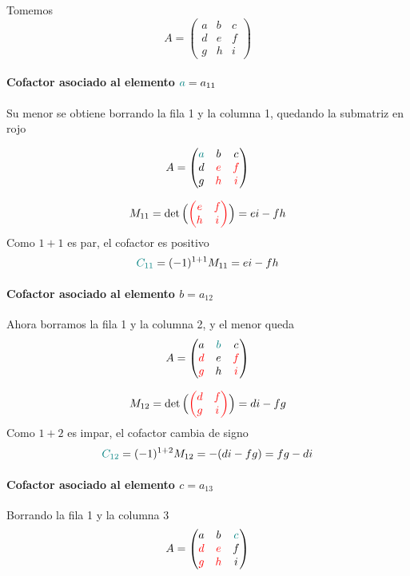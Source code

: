 \documentclass{article}
\begin{document}
Tomemos
\[
A=\begin{pmatrix}
a & b & c\\
d & e & f\\
g & h & i
\end{pmatrix}
\]

\paragraph*{Cofactor asociado al elemento \({\color{teal}a}=a_{11}\)} 
Su menor se obtiene borrando la fila 1 y la columna 1, quedando la submatriz en {\color{red}rojo}

\[
A=\begin{pmatrix}
\color{teal}a & b & c\\
d & \color{red}e & \color{red}f\\
g & \color{red}h & \color{red}i
\end{pmatrix}
\]


\[
M_{11}=\det\Big({\color{red}\begin{pmatrix} e & f\\ h & i \end{pmatrix}}\Big)=ei-fh
\]
Como \(1+1\) es par, el cofactor es positivo
\[
{\color{teal}{C_{11}}}=(-1)^{1+1}M_{11}=ei-fh
\]

\paragraph*{Cofactor asociado al elemento \(b=a_{12}\)} 
Ahora borramos la fila 1 y la columna 2, y el menor queda
\[
A=\begin{pmatrix}
a & \color{teal}b & c\\
\color{red}d & e & \color{red}f\\
 \color{red}g &h & \color{red}i
\end{pmatrix}
\]

\[
M_{12}=\det\Big({\color{red}\begin{pmatrix} d & f\\ g & i \end{pmatrix}}\Big)=di-fg
\]
Como \(1+2\) es impar, el cofactor cambia de signo
\[
{\color{teal}{C_{12}}}=(-1)^{1+2}M_{12}=-(di-fg)=fg-di
\]

\paragraph*{Cofactor asociado al elemento \(c=a_{13}\)} 
Borrando la fila 1 y la columna 3
\[
A=\begin{pmatrix}
a & b & \color{teal}c\\
\color{red}d &  \color{red}e &f\\
 \color{red}g & \color{red}h &i
\end{pmatrix}
\]
\end{document}
